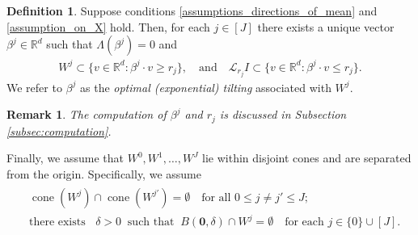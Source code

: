 \documentclass[aap,preprint]{imsart}
\theoremstyle{plain}
\newtheorem{remark}{Remark}[section]
\theoremstyle{definition}
\newtheorem{definition}{Definition}[section]
\begin{document}
\begin{definition}
\label{def:optimal_beta_j}
Suppose conditions \eqref{assumptions_directions_of_mean} and \eqref{assumption_on_X} hold. Then, for each $j \in [J]$ there exists a unique vector $\beta^j \in \mathbb{R}^d$ such that $\Lambda(\beta^j) =0$ and
\begin{align*}
    W^j \subset \{v \in \mathbb{R}^d : \beta^j \cdot v \geq r_j\}, \quad \text{and} \quad \mathcal{L}_{r_j} I \subset \{v \in \mathbb{R}^d : \beta^j \cdot v \leq r_j\}.
\end{align*}
We refer to $\beta^j$ as the \textit{optimal (exponential) tilting} associated with $W^j$.
\end{definition}

\begin{remark}
The computation of $\beta^j$ and $r_j$ is discussed in Subsection \ref{subsec:computation}.
\end{remark}

Finally, we assume that
 $W^0, W^1, \ldots, W^J$
 lie within disjoint cones and are separated from the origin. Specifically, we  assume 
\begin{align} \tag{C3} \label{assumption_on_regions}
    \begin{split}
        &\operatorname{cone}(W^j) \cap \operatorname{cone}(W^{j'}) = \emptyset \quad \text{for all } 0 \leq j \neq j' \leq J;\\
        &\text{there exists } \;\; \delta>0 \;\; \text{such that} \;\; B(\mathbf{0}, \delta) \cap W^j = \emptyset \quad \text{for each } j \in \{0\} \cup [J].
    \end{split}
\end{align}

 

\end{document}
